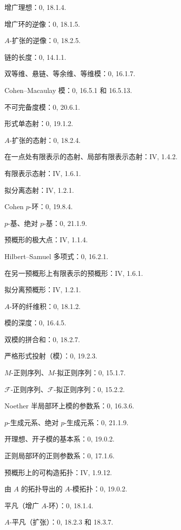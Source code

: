 增广理想：0, 18.1.4.\par
增广环的逆像：0, 18.1.5.\par
$A$-扩张的逆像：0, 18.2.5.\par

链的长度：0, 14.1.1.\par

双等维、悬链、等余维、等维模：0, 16.1.7.\par
Cohen--Macaulay 模：0, 16.5.1 和 16.5.13.\par
不可完备度模：0, 20.6.1.\par
形式单态射：0, 19.1.2.\par
$A$-扩张的态射：0, 18.2.4.\par
在一点处有限表示的态射、局部有限表示态射：IV, 1.4.2.\par
有限表示态射：IV, 1.6.1.\par
拟分离态射：IV, 1.2.1.\par

Cohen $p$-环：0, 19.8.4.\par
$p$-基、绝对 $p$-基：0, 21.1.9.\par
预概形的极大点：IV, 1.1.4.\par

\clearpage
{}
Hilbert--Samuel 多项式：0, 16.2.1.\par
在另一预概形上有限表示的预概形：IV, 1.6.1.\par
拟分离预概形：IV, 1.2.1.\par
$A$-环的纤维积：0, 18.1.2.\par
模的深度：0, 16.4.5.\par

双模的拼合和：0, 18.2.7.\par
严格形式投射（模）：0, 19.2.3.\par
$M$-正则序列、$M$-拟正则序列：0, 15.1.7.\par
$\mathscr F$-正则序列、$\mathscr F$-拟正则序列：0, 15.2.2.\par
Noether 半局部环上模的参数系：0, 16.3.6.\par
$p$-生成元系、绝对 $p$-生成元系：0, 21.1.9.\par
开理想、开子模的基本系：0, 19.0.2.\par
正则局部环的正则参数系：0, 17.1.6.\par

预概形上的可构造拓扑：IV, 1.9.12.\par
由 $A$ 的拓扑导出的 $A$-模拓扑：0, 19.0.2.\par
平凡（增广 $A$-环）：0, 18.1.4.\par
$A$-平凡（扩张）：0, 18.2.3 和 18.3.7.\par

